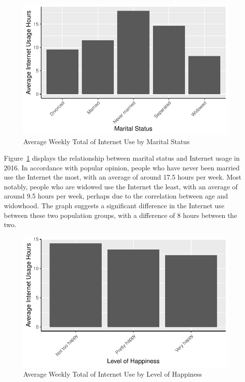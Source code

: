 \documentclass[
]{article}
\begin{document}
\begin{figure}

{\centering \includegraphics{paper_files/figure-pdf/fig-maritalandinternet-1.pdf}

}

\caption{\label{fig-maritalandinternet}Average Weekly Total of Internet
Use by Marital Status}

\end{figure}

Figure~\ref{fig-maritalandinternet} displays the relationship between
marital status and Internet usage in 2016. In accordance with popular
opinion, people who have never been married use the Internet the most,
with an average of around 17.5 hours per week. Most notably, people who
are widowed use the Internet the least, with an average of around 9.5
hours per week, perhaps due to the correlation between age and
widowhood. The graph suggests a significant difference in the Internet
use between these two population groups, with a difference of 8 hours
between the two.

\begin{figure}

{\centering \includegraphics{paper_files/figure-pdf/fig-happyandinternet-1.pdf}

}

\caption{\label{fig-happyandinternet}Average Weekly Total of Internet
Use by Level of Happiness}

\end{figure}
\end{document}
